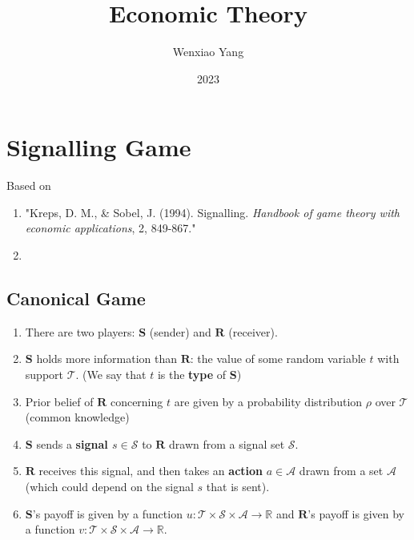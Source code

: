 \documentclass[11pt]{elegantbook}
\title{\textbf{Economic Theory}}
\author{Wenxiao Yang}
\institute{Haas School of Business, University of California Berkeley}
\date{2023}
\begin{document}
\maketitle
\frontmatter
\tableofcontents
\mainmatter



\chapter{Signalling Game}
Based on
\begin{enumerate}[$\circ$]
    \item "Kreps, D. M., \& Sobel, J. (1994). Signalling. \textit{Handbook of game theory with economic applications}, 2, 849-867."
    \item 
\end{enumerate}

\section{Canonical Game}
\begin{definition}
    \normalfont
    \begin{enumerate}
        \item There are two players: $\mathbf{S}$ (sender) and $\mathbf{R}$ (receiver).
        \item $\mathbf{S}$ holds more information than $\mathbf{R}$: the value of some random variable $t$ with support $\mathcal{T}$. (We say that $t$ is the \textbf{type} of $\mathbf{S}$)
        \item Prior belief of $\mathbf{R}$ concerning $t$ are given by a probability distribution $\rho$ over $\mathcal{T}$ (common knowledge)
        \item $\mathbf{S}$ sends a \textbf{signal $s\in \mathcal{S}$} to $\mathbf{R}$ drawn from a signal set $\mathcal{S}$.
        \item $\mathbf{R}$ receives this signal, and then takes an \textbf{action} $a\in \mathcal{A}$ drawn from a set $\mathcal{A}$ (which could depend on the signal $s$ that is sent).
        \item $\mathbf{S}$'s payoff is given by a function $u: \mathcal{T}\times \mathcal{S} \times \mathcal{A} \rightarrow \mathbb{R}$ and $\mathbf{R}$'s payoff is given by a function $v: \mathcal{T}\times \mathcal{S} \times \mathcal{A} \rightarrow \mathbb{R}$.
    \end{enumerate}
\end{definition}
\end{document}
